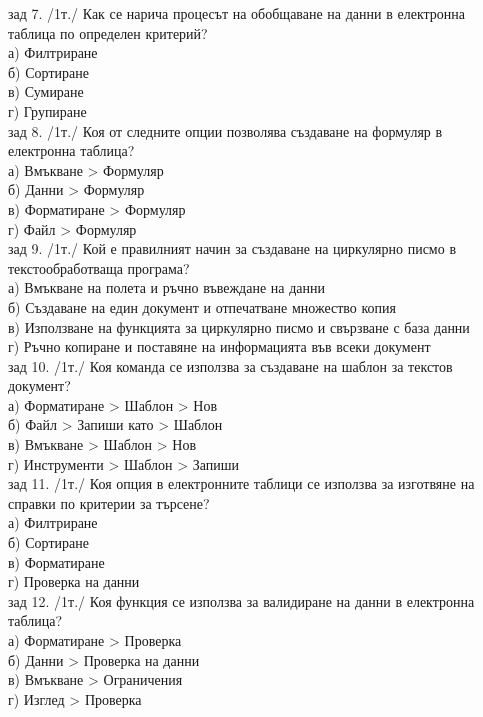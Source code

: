 % 
зад 7. /1т./ Как се нарича процесът на обобщаване на данни в електронна таблица по определен критерий?\\
а) Филтриране\\
б) Сортиране\\
в) Сумиране\\
г) Групиране\\

% 
зад 8. /1т./ Коя от следните опции позволява създаване на формуляр в електронна таблица?\\
а) Вмъкване > Формуляр\\
б) Данни > Формуляр\\
в) Форматиране > Формуляр\\
г) Файл > Формуляр\\

% 
зад 9. /1т./ Кой е правилният начин за създаване на циркулярно писмо в текстообработваща програма?\\
а) Вмъкване на полета и ръчно въвеждане на данни\\
б) Създаване на един документ и отпечатване множество копия\\
в) Използване на функцията за циркулярно писмо и свързване с база данни\\
г) Ръчно копиране и поставяне на информацията във всеки документ\\

% 
зад 10. /1т./ Коя команда се използва за създаване на шаблон за текстов документ?\\
а) Форматиране > Шаблон > Нов \\
б) Файл > Запиши като > Шаблон\\
в) Вмъкване > Шаблон > Нов\\
г) Инструменти > Шаблон > Запиши\\

% 
зад 11. /1т./ Коя опция в електронните таблици се използва за изготвяне на справки по критерии за търсене?\\
а) Филтриране\\
б) Сортиране\\
в) Форматиране\\
г) Проверка на данни\\

% 
зад 12. /1т./ Коя функция се използва за валидиране на данни в електронна таблица?\\
а) Форматиране > Проверка\\
б) Данни > Проверка на данни\\
в) Вмъкване > Ограничения\\
г) Изглед > Проверка \\

